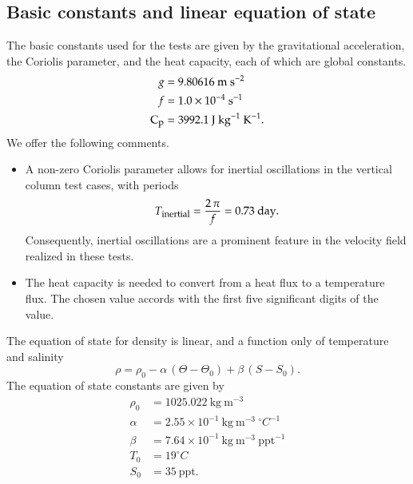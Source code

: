 \subsection{Basic constants and linear equation of state}

The basic constants used for the tests are given by the gravitational
acceleration, the Coriolis parameter, and the heat capacity, each of
which are global constants.
\begin{subequations}
\begin{align}
 g &= 9.80616~\mbox{m}~\mbox{s}^{-2}
 \\
 f &= 1.0 \times 10^{-4}~\mbox{s}^{-1}
 \\
\mbox{C}_{\mbox{\footnotesize p}} &= 3992.1~\mbox{J}~\mbox{kg}^{-1}~\mbox{K}^{-1}. 
\end{align}
\end{subequations}
We offer the following comments.
\begin{itemize}
\item A non-zero Coriolis parameter allows for inertial oscillations
  in the vertical column test cases, with periods 
\begin{equation}
   T_{\mbox{\footnotesize inertial}} = \frac{2 \, \pi}{f} = 0.73~\mbox{day}.
\label{eq:inertial-period}
\end{equation}
Consequently, inertial oscillations are a prominent feature in the
velocity field realized in these tests.

\item The heat capacity is needed to convert from a heat flux to a
  temperature flux.  The chosen value accords with the first five
  significant digits of the \cite{TEOS2010} value.

\end{itemize}
The equation of state for density is linear, and a function only of
temperature and salinity 
\begin{equation}
\rho = \rho_0 - \alpha \, (\Theta - \Theta_0) + \beta \, (S-S_0).
\label{eq:linear-eos}
\end{equation}
The equation of state constants are given by 
\begin{subequations}
\begin{align}
 \rho_0 &= 1025.022~\mbox{kg}~\mbox{m}^{-3}
\label{eq:linear-eos-paramA}
 \\
\alpha &= 2.55 \times 10^{-1}~\mbox{kg}~\mbox{m}^{-3}~^{\circ}C^{-1}
\\
\beta &= 7.64\times10^{-1}~\mbox{kg}~\mbox{m}^{-3}~\mbox{ppt}^{-1}
 \\
T_0  &=  19^{\circ}C 
\\
S_0 &=  35~\mbox{ppt}.
\label{eq:linear-eos-paramB}
\end{align}
\end{subequations}


